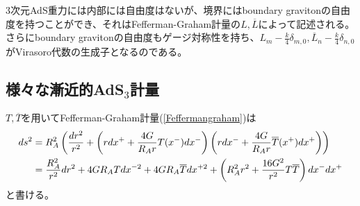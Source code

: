 3次元AdS重力には内部には自由度はないが、境界にはboundary gravitonの自由度を持つことができ、それはFefferman-Graham計量の$L,\overline{L}$によって記述される。さらにboundary gravitonの自由度もゲージ対称性を持ち、$L_m-\frac{k}{4}\delta_{m,0},\overline{L}_n-\frac{k}{4}\delta_{n,0}$がVirasoro代数の生成子となるのである。

\subsection{様々な漸近的AdS$_3$計量}
$T,\overline{T}$を用いてFefferman-Graham計量(\ref{Feffermangraham})は
\begin{align}\label{FeffermangrahamT}
ds^2&=R_A^2\left(\frac{dr^2}{r^2}+\left(rdx^+ +\frac{4G}{R_A r}T(x^-)dx^- \right)\left(rdx^- +\frac{4G}{R_A r}\overline{T}(x^+)dx^+ \right)\right) \notag\\
&=\frac{R_A^2}{r^2}dr^2+4GR_A Tdx^{-2}+4GR_A \overline{T}dx^{+2}+\left(R_A^2 r^2+\frac{16G^2}{r^2}T\overline{T}\right)dx^-dx^+
\end{align}
と書ける。

